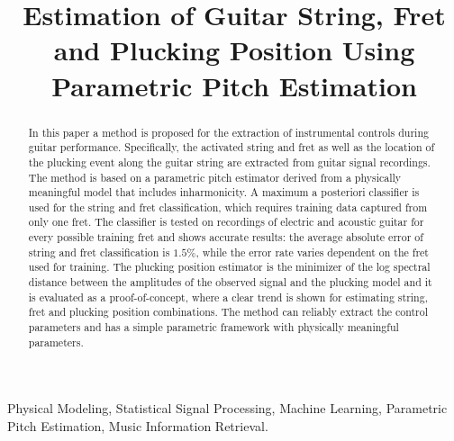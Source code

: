\documentclass{article}
\title{Estimation of Guitar String, Fret and Plucking Position Using Parametric Pitch Estimation}
\begin{document}
\ninept
\maketitle
%
%
%
%
\begin{abstract}
In this paper a method is proposed for the extraction of instrumental controls during guitar performance. Specifically, the activated string and fret as well as the location of the plucking event along the guitar string are extracted from guitar signal recordings. The method is based on a parametric pitch estimator derived from a physically meaningful model that includes inharmonicity. A maximum a posteriori classifier is used for the string and fret classification, which requires training data captured from only one fret. The classifier is tested on recordings of electric and acoustic guitar for every possible training fret and shows accurate results: the average absolute error of string and fret classification is $1.5\%$, while the error rate varies dependent on the fret used for training. The plucking position estimator is the minimizer of the log spectral distance between the amplitudes of the observed signal and the plucking model and it is evaluated as a proof-of-concept, where a clear trend is shown for estimating string, fret and plucking position combinations. The method can reliably extract the control parameters and has a simple parametric framework with physically meaningful parameters.

\end{abstract}
%
\begin{keywords}
 Physical Modeling, Statistical Signal Processing, Machine Learning, Parametric Pitch Estimation, Music Information Retrieval.\vspace{-.8mm}
\end{keywords}
%
%
%
%
%
%
%
%
% 
% 
%
\end{document}
